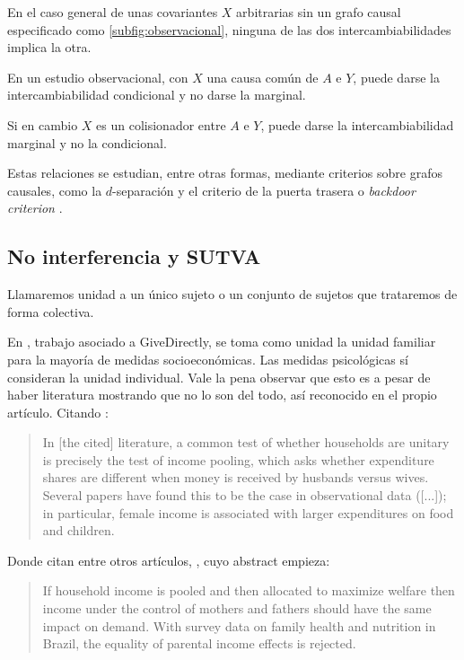 \begin{observacion}
    En el caso general de unas covariantes $X$ arbitrarias sin un grafo causal especificado
    como \autoref{subfig:observacional}, ninguna de las dos intercambiabilidades implica la otra.

    En un estudio observacional, con $X$ una causa común de $A$ e $Y$, puede darse
    la intercambiabilidad condicional y no darse la marginal.

    Si en cambio $X$ es un colisionador entre $A$ e $Y$,
    puede darse la intercambiabilidad marginal y no la condicional.

    Estas relaciones se estudian, entre otras formas, mediante criterios sobre grafos causales,
    como la $d$-separación \cite[1.2.3]{pearl2009causality} y el criterio de la puerta trasera
    o \emph{backdoor criterion} \cite[3.3.1]{pearl2009causality}.
\end{observacion}

\subsection{No interferencia y SUTVA}
\begin{definicion}[Unidad]\label{def:unidad}
    Llamaremos unidad a un único sujeto o un conjunto de sujetos que trataremos de forma colectiva.
\end{definicion}

\begin{ejemplo}
    En \cite{Haushofer2016}, trabajo asociado a GiveDirectly,
    se toma como unidad la unidad familiar para la mayoría de medidas socioeconómicas.
    Las medidas psicológicas sí consideran la unidad individual.
    Vale la pena observar que esto es a pesar de haber literatura mostrando que no lo son del todo,
    así reconocido en el propio artículo.
    Citando \cite{Haushofer2016}:
    \begin{quotation}
        In [the cited] literature, a common test of whether households are unitary is precisely the
        test of income pooling, which asks whether expenditure shares are different when money is received
        by husbands versus wives. Several papers have found this to be the case in observational data ([...]);
        in particular, female income is associated with larger expenditures on food and children.
    \end{quotation}
    Donde citan entre otros artículos, \cite{Thomas1990}, cuyo abstract empieza:
    \begin{quotation}
        If household income is pooled and then allocated to maximize welfare then income under the
        control of mothers and fathers should have the same impact on demand. With survey data on
        family health and nutrition in Brazil, the equality of parental income effects is rejected.
    \end{quotation}
\end{ejemplo}

